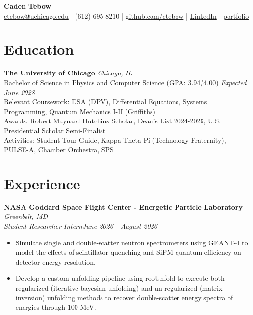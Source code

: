 \documentclass[10pt]{article}
\begin{document}
\begin{center}
{\LARGE \textbf{Caden Tebow}} \\[4pt]
\href{mailto:ctebow@uchicago.edu}{ctebow@uchicago.edu} | (612) 695-8210 |
\href{https://github.com/ctebow}{github.com/ctebow} | \href{https://www.linkedin.com/in/caden-tebow-233368297/}{LinkedIn} | \href{https://ctebow.github.io/}{portfolio}
\end{center}

\vspace{-6pt}

\section*{Education}

\textbf{The University of Chicago} \hfill \emph{Chicago, IL} \\
Bachelor of Science in Physics and Computer Science (GPA: 3.94/4.00) \hfill \emph{Expected June 2028} \\
Relevant Coursework: DSA (DPV), Differential Equations, Systems Programming, Quantum Mechanics I-II (Griffiths) \\
Awards: Robert Maynard Hutchins Scholar, Dean’s List 2024-2026, U.S. Presidential Scholar Semi-Finalist \\
Activities: Student Tour Guide, Kappa Theta Pi (Technology Fraternity), PULSE-A, Chamber Orchestra, SPS

\vspace{2pt}

\section*{Experience}

\textbf{NASA Goddard Space Flight Center - Energetic Particle Laboratory} \hfill \emph{Greenbelt, MD} \\ \emph{Student Researcher Intern}\hfill \emph{June 2026 - August 2026}
\begin{itemize}
\item Simulate single and double-scatter neutron spectrometers using GEANT-4 to model the effects of scintillator quenching and SiPM quantum efficiency on detector energy resolution. 
\item Develop a custom unfolding pipeline using rooUnfold to execute both regularized (iterative bayesian unfolding) and un-regularized (matrix inversion) unfolding methods to recover double-scatter energy spectra of energies through 100 MeV. 
\end{itemize}
\end{document}
